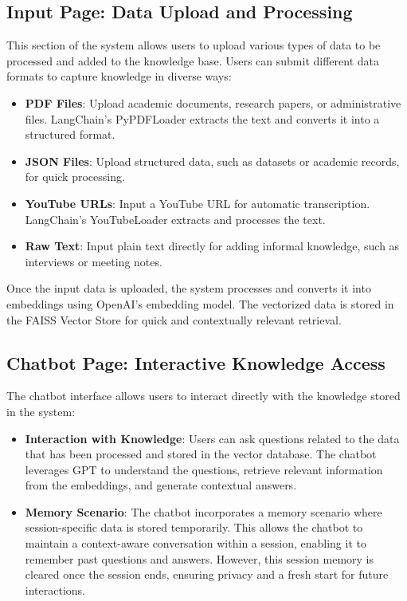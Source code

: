\documentclass[runningheads]{llncs}
\begin{document}
\subsection{Input Page: Data Upload and Processing}
This section of the system allows users to upload various types of data to be processed and added to the knowledge base. Users can submit different data formats to capture knowledge in diverse ways:
\begin{itemize}
    \item \textbf{PDF Files}: Upload academic documents, research papers, or administrative files. LangChain's PyPDFLoader extracts the text and converts it into a structured format.
    \item \textbf{JSON Files}: Upload structured data, such as datasets or academic records, for quick processing.
    \item \textbf{YouTube URLs}: Input a YouTube URL for automatic transcription. LangChain's YouTubeLoader extracts and processes the text.
    \item \textbf{Raw Text}: Input plain text directly for adding informal knowledge, such as interviews or meeting notes.
\end{itemize}

Once the input data is uploaded, the system processes and converts it into embeddings using OpenAI's embedding model. The vectorized data is stored in the FAISS Vector Store for quick and contextually relevant retrieval.

\subsection{Chatbot Page: Interactive Knowledge Access}
The chatbot interface allows users to interact directly with the knowledge stored in the system:
\begin{itemize}
    \item \textbf{Interaction with Knowledge}: Users can ask questions related to the data that has been processed and stored in the vector database. The chatbot leverages GPT to understand the questions, retrieve relevant information from the embeddings, and generate contextual answers.
    \item \textbf{Memory Scenario}: The chatbot incorporates a memory scenario where session-specific data is stored temporarily. This allows the chatbot to maintain a context-aware conversation within a session, enabling it to remember past questions and answers. However, this session memory is cleared once the session ends, ensuring privacy and a fresh start for future interactions.
\end{itemize}
\end{document}
